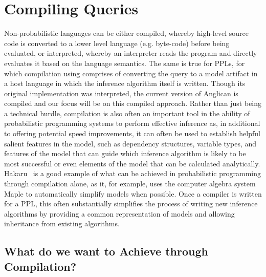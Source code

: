 
\section{Compiling Queries}
\label{sec:proginf:comp}

Non-probabilistic languages can be either compiled, whereby high-level source code
is converted to a lower level language (e.g. byte-code) before being evaluated, or interpreted,
whereby an interpreter reads the program and directly evaluates it based on the language
semantics.
The same is true for PPLs, for which compilation using comprises of converting the
query to a model artifact in a host language in which the inference algorithm itself is
written.  Though its original implementation was interpreted, the current version of
Anglican is compiled and our focus will be on this compiled approach.
Rather than just being a technical hurdle, compilation is also 
often an important tool in the ability of probabilistic programming systems to perform
effective inference as, in additional to offering potential speed improvements,
it can often be used to establish helpful salient features in the model,
such as dependency structures, variable types, and features of the model that can guide
which inference algorithm is likely to be most successful or even elements of the model
that can be calculated analytically.  Hakaru~\citep{narayanan2016probabilistic} is a good
example of what can be achieved in probabilistic programming through compilation alone,
as it, for example, uses the computer algebra system Maple to automatically simplify models
when possible.  Once a compiler is written for a PPL, this often substantially simplifies
the process of writing new inference algorithms by providing a common representation of
models and allowing inheritance from existing algorithms.

\subsection{What do we want to Achieve through Compilation?}
\label{sec:proginf:comp:want}

